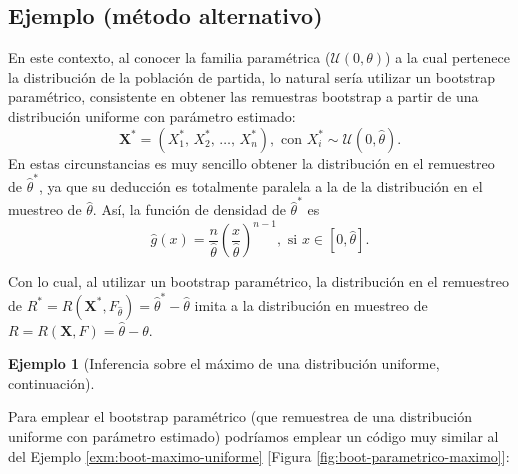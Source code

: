 \documentclass[
]{book}
\theoremstyle{break}
\theoremstyle{definition}
\theoremstyle{definition}
\newtheorem{example}{Ejemplo}[chapter]
\theoremstyle{definition}
\theoremstyle{remark}
\begin{document}
\hypertarget{ejemplo-muxe9todo-alternativo}{%
\subsection{Ejemplo (método alternativo)}\label{ejemplo-muxe9todo-alternativo}}

En este contexto, al conocer la familia paramétrica (\(\mathcal{U}\left( 0,\theta \right)\)) a la cual pertenece la distribución de la población de
partida, lo natural sería utilizar un bootstrap paramétrico, consistente
en obtener las remuestras bootstrap a partir de una distribución
uniforme con parámetro estimado:
\[\mathbf{X}^{\ast}=\left( X_1^{\ast}\text{, }X_2^{\ast}\text{, 
}\ldots \text{, }X_n^{\ast} \right), \text{ con } X_i^{\ast} \sim \mathcal{U}\left( 0,\hat{\theta}\right).\]
En estas circunstancias es muy sencillo obtener la distribución en el
remuestreo de \(\hat{\theta}^{\ast}\), ya que su deducción es totalmente
paralela a la de la distribución en el muestreo de \(\hat{\theta}\). Así,
la función de densidad de \(\hat{\theta}^{\ast}\) es
\[\hat{g}\left( x \right) =\frac{n}{\hat{\theta}}\left( \frac{x}{\hat{\theta}}
 \right)^{n-1},\text{ si }x\in \left[ 0,\hat{\theta}\right] .\]

Con lo cual, al utilizar un bootstrap paramétrico, la distribución en el
remuestreo de \(R^{\ast}=R\left( \mathbf{X}^{\ast},F_{\hat{ \theta}} \right) =\hat{\theta}^{\ast}-\hat{\theta}\) imita a la
distribución en muestreo de
\(R=R\left( \mathbf{X},F \right) =\hat{\theta}-\theta\).

\begin{example}[Inferencia sobre el máximo de una distribución uniforme, continuación]
\protect\hypertarget{exm:boot-maximo-parametrico}{}{\label{exm:boot-maximo-parametrico} \iffalse (Inferencia sobre el máximo de una distribución uniforme, continuación) \fi{} }
\end{example}

Para emplear el bootstrap paramétrico (que remuestrea de una distribución
uniforme con parámetro estimado) podríamos emplear un código muy similar al
del Ejemplo \ref{exm:boot-maximo-uniforme} {[}Figura \ref{fig:boot-parametrico-maximo}{]}:
\end{document}
